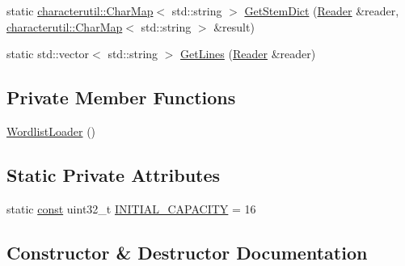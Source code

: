\begin{DoxyCompactItemize}
static \mbox{\hyperlink{classlucene_1_1core_1_1analysis_1_1characterutil_1_1CharMap}{characterutil\+::\+Char\+Map}}$<$ std\+::string $>$ \mbox{\hyperlink{classlucene_1_1core_1_1analysis_1_1WordlistLoader_abefbb47cbb9b31c92d4f4b0a55f7f258}{Get\+Stem\+Dict}} (\mbox{\hyperlink{classlucene_1_1core_1_1analysis_1_1Reader}{Reader}} \&reader, \mbox{\hyperlink{classlucene_1_1core_1_1analysis_1_1characterutil_1_1CharMap}{characterutil\+::\+Char\+Map}}$<$ std\+::string $>$ \&result)
\item 
static std\+::vector$<$ std\+::string $>$ \mbox{\hyperlink{classlucene_1_1core_1_1analysis_1_1WordlistLoader_aa33dab48a9ce69a8b36dea4a7caa7de8}{Get\+Lines}} (\mbox{\hyperlink{classlucene_1_1core_1_1analysis_1_1Reader}{Reader}} \&reader)
\end{DoxyCompactItemize}
\subsection*{Private Member Functions}
\begin{DoxyCompactItemize}
\item 
\mbox{\hyperlink{classlucene_1_1core_1_1analysis_1_1WordlistLoader_a19b09865a0d3f9783ce84e5bca3e8481}{Wordlist\+Loader}} ()
\end{DoxyCompactItemize}
\subsection*{Static Private Attributes}
\begin{DoxyCompactItemize}
\item 
static \mbox{\hyperlink{ZlibCrc32_8h_a2c212835823e3c54a8ab6d95c652660e}{const}} uint32\+\_\+t \mbox{\hyperlink{classlucene_1_1core_1_1analysis_1_1WordlistLoader_a903bb8e9044b6ce1c4e09ffe405344b8}{I\+N\+I\+T\+I\+A\+L\+\_\+\+C\+A\+P\+A\+C\+I\+TY}} = 16
\end{DoxyCompactItemize}


\subsection{Constructor \& Destructor Documentation}
\mbox{\label{classlucene_1_1core_1_1analysis_1_1WordlistLoader_a19b09865a0d3f9783ce84e5bca3e8481}} 
